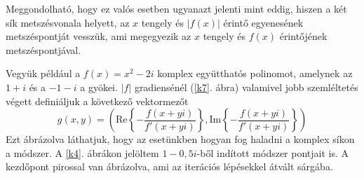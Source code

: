 \documentclass[a4paper,12pt]{report}
\begin{document}
			Meggondolható, hogy ez valós esetben ugyanazt jelenti mint eddig, hiszen a két sík metszésvonala helyett, az $x$ tengely és $|f(x)|$ érintő egyenesének metszéspontját vesszük, ami megegyezik az $x$ tengely és $f(x)$ érintőjének metszéspontjával.

			Vegyük például a $f(x)=x^2-2i$ komplex együtthatós polinomot, amelynek az $1+i$ és a $-1-i$ a gyökei. $|f|$ gradiensénél (\ref{k7}. ábra) valamivel jobb szemléltetés végett definiáljuk a következő vektormezőt
			\[g(x,y)=\left(\mathrm{Re} \left\{ -\frac{f(x+yi)}{f'(x+yi)} \right \} ,\mathrm{Im} \left\{-\frac{f(x+yi)}{f'(x+yi)}\right \} \right)\]
			Ezt ábrázolva láthatjuk, hogy az esetünkben hogyan fog haladni a komplex síkon a módszer. A \ref{k4}. ábrákon jelöltem $1-0,\!5i$-ből indított módszer pontjait is. A kezdőpont pirossal van ábrázolva, ami az iterációs lépésekkel átvált sárgába.
\end{document}
